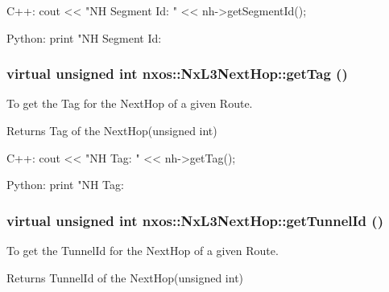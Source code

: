 \begin{DoxyCode}
  C++:
       cout << "NH Segment Id: " << nh->getSegmentId();

  Python:
       print "NH Segment Id: %
\end{DoxyCode}
 \hypertarget{classnxos_1_1NxL3NextHop_ab1f31be8dc748644f6ee2e4d6cbfda6c}{
\subsubsection[{getTag}]{\setlength{\rightskip}{0pt plus 5cm}virtual unsigned int nxos::NxL3NextHop::getTag ()}}
\label{classnxos_1_1NxL3NextHop_ab1f31be8dc748644f6ee2e4d6cbfda6c}
To get the Tag for the NextHop of a given Route.

\begin{DoxyReturn}{Returns}
Tag of the NextHop(unsigned int)
\end{DoxyReturn}

\begin{DoxyCode}
  C++:
       cout << "NH Tag: " << nh->getTag();

  Python:
       print "NH Tag: %
\end{DoxyCode}
 \hypertarget{classnxos_1_1NxL3NextHop_aaaf9a3c718cf01e57c36d95a4fd19980}{
\subsubsection[{getTunnelId}]{\setlength{\rightskip}{0pt plus 5cm}virtual unsigned int nxos::NxL3NextHop::getTunnelId ()}}
\label{classnxos_1_1NxL3NextHop_aaaf9a3c718cf01e57c36d95a4fd19980}
To get the TunnelId for the NextHop of a given Route.

\begin{DoxyReturn}{Returns}
TunnelId of the NextHop(unsigned int)
\end{DoxyReturn}

